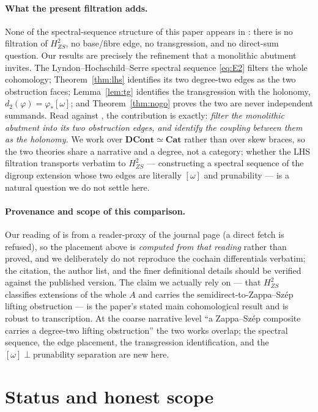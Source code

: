 \documentclass[11pt]{article}
\theoremstyle{definition}
\begin{document}
\paragraph{What the present filtration adds.} None of the spectral-sequence structure of
this paper appears in \cite{oluyori}: there is no filtration of $H^2_{ZS}$, no base/fibre
edge, no transgression, and no direct-sum question. Our results are precisely the refinement
that a monolithic abutment invites. The Lyndon--Hochschild--Serre spectral sequence
\eqref{eq:E2} filters the whole cohomology; Theorem~\ref{thm:lhs} identifies its two
degree-two edges as the two obstruction faces; Lemma~\ref{lem:tg} identifies the
transgression with the holonomy, $d_2(\varphi)=\varphi_*[\omega]$; and
Theorem~\ref{thm:nogo} proves the two are never independent summands. Read against
\cite{oluyori}, the contribution is exactly: \emph{filter the monolithic abutment into its
two obstruction edges, and identify the coupling between them as the holonomy.} We work over
$\mathbf{DCont}\simeq\mathbf{Cat}$ rather than over skew braces, so the two theories share a
narrative and a degree, not a category; whether the LHS filtration transports verbatim to
$H^2_{ZS}$ --- constructing a spectral sequence of the digroup extension whose two edges are
literally $[\omega]$ and prunability --- is a natural question we do not settle here.

\paragraph{Provenance and scope of this comparison.} Our reading of \cite{oluyori} is from a
reader-proxy of the journal page (a direct fetch is refused), so the placement above is
\emph{computed from that reading} rather than proved, and we deliberately do not reproduce
the cochain differentials verbatim; the citation, the author list, and the finer
definitional details should be verified against the published version. The claim we actually
rely on --- that $H^2_{ZS}$ classifies extensions of the whole $A$ and carries the
semidirect-to-Zappa--Sz\'ep lifting obstruction --- is the paper's stated main cohomological
result and is robust to transcription. At the coarse narrative level ``a Zappa--Sz\'ep
composite carries a degree-two lifting obstruction'' the two works overlap; the spectral
sequence, the edge placement, the transgression identification, and the
$[\omega]\perp\text{prunability}$ separation are new here.

\section{Status and honest scope}\label{sec:status}
\end{document}
